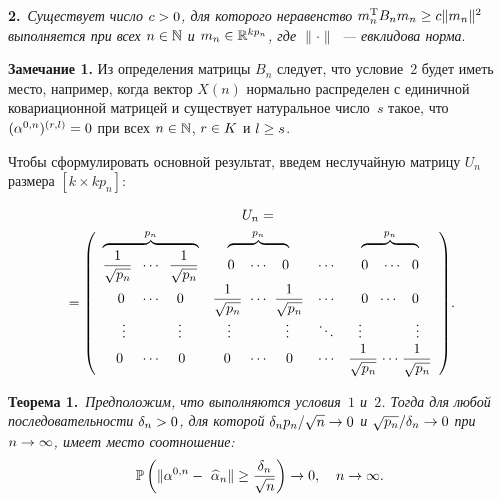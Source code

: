 \begin{multicols}{2}
\medskip

\noindent
\textbf{2.}\  \textit{Существует число $c\hm>0$, для которого неравенство 
$m^{\mathrm{T}}_nB_nm_n\hm\geq c\|m_n\|^2$ выполняется при всех $n\hm\in\N$ и $m_n\hm\in\R^{kp_n}$, 
где $\|\cdot\|$~--- евклидова норма}.


\medskip

\noindent
\textbf{Замечание 1.}
Из определения матрицы $B_n$ следует, что условие~2 будет иметь место, 
например, когда вектор $X(n)$ нормально распределен с единичной ковариационной матрицей 
и существует натуральное чис\-ло~$s$ такое, что $(\alpha^{0,n})^{(r,l)}\hm=0$ 
при всех $n\hm\in\mathbb{N}$, $r\hm\in K$ и $l\hm\geq s$.

\medskip

Чтобы сформулировать основной результат, введем неслучайную матрицу $U_n$ 
размера $[k\times kp_n]$:

\noindent
{\footnotesize
\begin{multline*}
U_n={}\\
{}=\left(\begin{array}{ccccc}\overbrace{\fr{1}{\sqrt{p_n}}\;\;\cdots\;\;
\fr{1}{\sqrt{p_n}}}^{p_n}&\overbrace{0\;\;\;\;\!\cdots\!\;\;\;\;0\vphantom{\fr{1}{p_n}}}^{p_n}&
\cdots&\overbrace{0\;\;\;\;\!\cdots\!\;\;\;0\vphantom{\fr{1}{p_n}}}^{p_n}\\
0\;\;\;\;\cdots\;\;\;\;0&\displaystyle{\fr{1}{\sqrt{p_n}}}\;\;\!\cdots\!\;\;
\fr{1}{\sqrt{p_n}}&\cdots&0\;\;\;\!\cdots\!\;\;\;\;0\\
\vdots\;\;\;\;\;\;\;\;\;\;\;\;\;\;\!\vdots\!&\vdots\;\;\;\;\;\;\;\;\;\;\;\;\;\;\vdots&\!\ddots\!&\!\vdots\!\;\;\;\;\;\;\;\;\;\;\;\;\;\;\;\!\vdots\\
0\;\;\;\;\;\!\cdots\!\;\;\;\;\;0&0\;\;\;\;\;\!\cdots\!\;\;\;\;\;0&\!\cdots\!&\displaystyle{\fr{1}{\sqrt{p_n}}}\;\!\cdots\!\;\frac1{\sqrt{p_n}}
\end{array}\right)\!.
\end{multline*}}

\noindent
\textbf{Теорема 1.}\
\textit{Предположим, что выполняются условия~$1$ и~$2$. Тогда для любой 
последовательности $\delta_n\hm>0$, для которой $\delta_np_n/\sqrt{n}\hm\rightarrow0$ и 
$\sqrt{p_n}/\delta_n\hm\rightarrow0$ при $n\hm\rightarrow\infty$, имеет место соотношение:}
\begin{gather*}
\mathbb{P}\left(\|\alpha^{0,n}-~\widehat{\alpha}_n\|\geq \displaystyle\frac{\displaystyle \delta_n\mathstrut}{\displaystyle \sqrt{n}\mathstrut}\right)\rightarrow0,\,\,\,\;\;n\rightarrow\infty.
\end{gather*}



\end{multicols}
